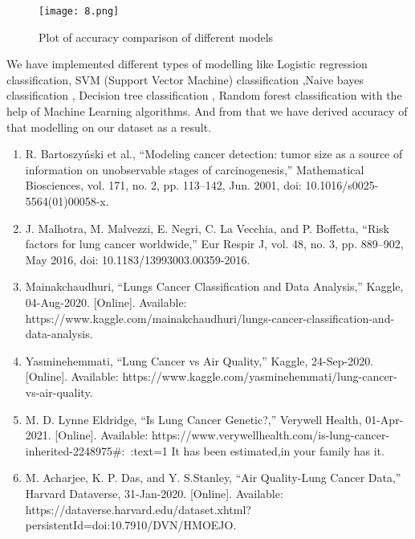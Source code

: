 \documentclass{article}
\begin{document}
\begin{enumerate}
	\begin{figure}[htbp]
	\centerline{\texttt{[image: 8.png]}}
	\caption{Plot of accuracy comparison of different models
	}		
\end{figure}

We have implemented different types of modelling like Logistic regression classification, SVM (Support Vector Machine) classification ,Naive bayes classification , Decision tree classification , Random forest classification with the help of Machine Learning algorithms. And from that we have derived accuracy of that modelling on our dataset as a result. 


		
	\end{enumerate} 
	
	
	
	
	
	
\pagebreak
	
	
	
	\begin{enumerate}
		\item R. Bartoszyński et al., “Modeling cancer detection: tumor size as a source of information on unobservable stages of carcinogenesis,” Mathematical Biosciences, vol. 171, no. 2, pp. 113–142, Jun. 2001, doi: 10.1016/s0025-5564(01)00058-x.
		
		\item J. Malhotra, M. Malvezzi, E. Negri, C. La Vecchia, and P. Boffetta, “Risk factors for lung cancer worldwide,” Eur Respir J, vol. 48, no. 3, pp. 889–902, May 2016, doi: 10.1183/13993003.00359-2016.
		
		\item Mainakchaudhuri, “Lungs Cancer Classification and Data Analysis,” Kaggle, 04-Aug-2020. [Online]. Available: https://www.kaggle.com/mainakchaudhuri/lungs-cancer-classification-and-data-analysis. 
		\item Yasminehemmati, “Lung Cancer vs Air Quality,” Kaggle, 24-Sep-2020. [Online]. Available: https://www.kaggle.com/yasminehemmati/lung-cancer-vs-air-quality.
		
    	\item M. D. Lynne Eldridge, “Is Lung Cancer Genetic?,” Verywell Health, 01-Apr-2021. [Online]. Available: https://www.verywellhealth.com/is-lung-cancer-inherited-2248975#:~:text=1 It has been estimated,in your family has it.
    	
    	\item M. Acharjee, K. P. Das, and Y. S.Stanley, “Air Quality-Lung Cancer Data,” Harvard Dataverse, 31-Jan-2020. [Online]. Available: https://dataverse.harvard.edu/dataset.xhtml?persistentId=doi:10.7910/DVN/HMOEJO. 
	\end{enumerate}
	
\end{document}
